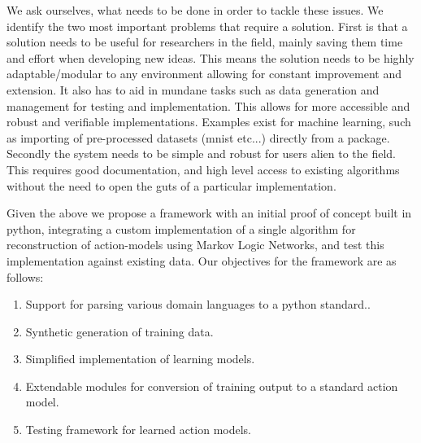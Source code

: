 % 
We ask ourselves, what needs to be done in order to tackle these issues. We identify the two most important problems that require a solution. First is that a solution needs to be useful for researchers in the field, mainly saving them time and effort when developing new ideas. This means the solution needs to be highly adaptable/modular to any environment allowing for constant improvement and extension. It also has to aid in mundane tasks such as data generation and management for testing and implementation. This allows for more accessible and robust and verifiable implementations. Examples exist for machine learning, such as importing of pre-processed datasets (mnist etc...) directly from a package. Secondly the system needs to be simple and robust for users alien to the field. This requires good documentation, and high level access to existing algorithms without the need to open the guts of a particular implementation.

Given the above we propose a framework with an initial proof of concept built in python, integrating a custom implementation of a single algorithm for reconstruction of action-models using Markov Logic Networks, and test this implementation against existing data. 
Our objectives for the framework are as follows: \begin{enumerate}
    \item Support for parsing various domain languages to a python standard..
    \item Synthetic generation of training data.
    \item Simplified implementation of learning models.
    \item Extendable modules for conversion of training output to a standard action model.
    \item Testing framework for learned action models.
\end{enumerate}
